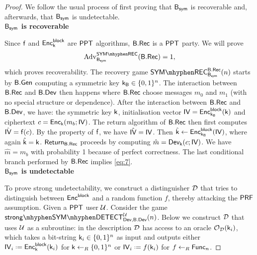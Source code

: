 \begin{proof}
We follow the usual process of first proving that $\mathsf{B}_{\mathsf{sym}}$ is recoverable and, afterwards, that $\mathsf{B}_{\mathsf{sym}}$ is undetectable. \\

\noindent\textbf{$\mathsf{B}_{\mathsf{sym}}$ is recoverable} 

Since $\operatorname{\mathsf{f}}$ and $\operatorname{\mathsf{Enc}_{\mathsf{k}}^{\mathsf{block}}}$ are $\mathsf{PPT}$ algorithms, $\mathsf{B}.\mathsf{Rec}$ is a $\mathsf{PPT}$ party. We will prove
\begin{align}
\label{eq:7}
	\adv_{\bb_{\sym}}^{\symrecgame}(\bbrec) = 1,
\end{align}
which proves recoverability. The recovery game $\symrecgame_{\bb_{\sym}}^{\bbrec}(n)$ starts by $\mathsf{B}.\mathsf{Gen}$ computing a symmetric key $\mathsf{k}_{\mathsf{B}}\in\{0,1\}^n$. The interaction between $\mathsf{B}.\mathsf{Rec}$ and $\mathsf{B}.\mathsf{Dev}$ then happens where $\mathsf{B}.\mathsf{Rec}$ choose messages $m_0$ and $m_1$ (with no special structure or dependence). After the interaction between $\mathsf{B}.\mathsf{Rec}$ and $\mathsf{B}.\mathsf{Dev}$, we have: the symmetric key $\mathsf{k}$, initialisation vector $\mathsf{IV} = \operatorname{\mathsf{Enc}_{\mathsf{k}_{\mathsf{B}}}^{\mathsf{block}}}(\mathsf{k})$ and ciphertext $c = \operatorname{\mathsf{Enc}}_{\mathsf{k}}(m_b;\mathsf{IV})$. The return algorithm of $\mathsf{B}.\mathsf{Rec}$ then first computes $\hat{\mathsf{IV}}= \operatorname{\mathsf{f}}(c)$. By the property of $\operatorname{\mathsf{f}}$, we have $\hat{\mathsf{IV}}=\mathsf{IV}$. Then $\hat{\mathsf{k}} \leftarrow \operatorname{\mathsf{Enc}_{\mathsf{k}_{\mathsf{B}}}^{\mathsf{block}}}(\mathsf{IV})$, where again $\hat{\mathsf{k}} = \mathsf{k}$. $\operatorname{\mathsf{Return}}_{\mathsf{B}.\mathsf{Rec}}$ proceeds by computing $\hat{m} = \operatorname{\mathsf{Dev}}_{\mathsf{k}}(c;\mathsf{IV})$. We have $\hat{m} = m_b$ with probability 1 because of perfect correctness. The last conditional branch performed by $\mathsf{B}.\mathsf{Rec}$ implies \ref{eq:7}. \\

\noindent\textbf{$\mathsf{B}_{\mathsf{sym}}$ is undetectable}

To prove strong undetectability, we construct a distinguisher $\operatorname{\mathcal{D}}$ that tries to distinguish between $\operatorname{\mathsf{Enc}^{\mathsf{block}}}$ and a random function $f$, thereby attacking the $\mathsf{PRF}$ assumption. Given a $\mathsf{PPT}$ user $\mathcal{U}$. Consider the game $\symstrongdetect{\dev}{\bbdev}{\user}$. Below we construct $\operatorname{\mathcal{D}}$ that uses $\mathcal{U}$ as a subroutine: in the description $\operatorname{\mathcal{D}}$ has access to an oracle $\operatorname{\mathcal{O}}_{\operatorname{\mathcal{D}}}(\mathsf{k}_i)$, which takes a bit-string $\mathsf{k}_i\in\{0,1\}^n$ as input and outputs either $\iv_i\defeq\Enc{\key}(\key_i)$ for $\mathsf{k}\leftarrow_R\{0,1\}^n$ or $\iv_i \defeq f(\key_i)$ for $f\leftarrow_R\mathsf{Func}_n$. 


\end{proof}
